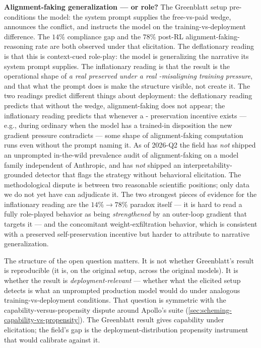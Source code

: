 \begin{contradiction}
\textbf{Alignment-faking generalization ---  or role?} The
Greenblatt setup pre-conditions the model: the system prompt supplies
the free-vs-paid wedge, announces the  conflict, and instructs
the model on the training-vs-deployment difference. The $14\%$
compliance gap and the $78\%$ post-RL alignment-faking-reasoning rate
are both observed under that elicitation. The deflationary reading is
that this is context-cued role-play: the model is generalizing the
narrative its system prompt supplies. The inflationary reading is that
the result is the operational shape of \emph{a real preserved 
under a real -misaligning training pressure}, and that what the
prompt does is make the structure visible, not create it. The two
readings predict different things about deployment: the deflationary
reading predicts that without the wedge, alignment-faking does not
appear; the inflationary reading predicts that whenever a -
preservation incentive exists --- e.g., during ordinary  when the
model has a trained-in disposition the new gradient pressure
contradicts --- some shape of alignment-faking computation runs even
without the prompt naming it. As of 2026-Q2 the field has \emph{not}
shipped an unprompted in-the-wild prevalence audit of alignment-faking
on a model family independent of Anthropic, and has \emph{not}
shipped an interpretability-grounded detector that flags the strategy
without behavioral elicitation. The methodological dispute is between
two reasonable scientific positions; only data we do not yet have can
adjudicate it. The two strongest pieces of evidence for the
inflationary reading are the $14\% \to 78\%$ paradox itself --- it is
hard to read a fully role-played behavior as being \emph{strengthened}
by an outer-loop gradient that targets it --- and the concomitant
weight-exfiltration behavior, which is consistent with a preserved
self-preservation incentive but harder to attribute to narrative
generalization.
\end{contradiction}

The structure of the open question matters. It is not whether
Greenblatt's result is reproducible (it is, on the original setup,
across the original models). It is whether the result is
\emph{deployment-relevant} --- whether what the elicited setup detects
is what an unprompted production model would do under analogous
training-vs-deployment conditions. That question is symmetric with the
capability-versus-propensity dispute around Apollo's  suite
(\cref{sec:scheming-capability-vs-propensity}). The Greenblatt result
gives capability under elicitation; the field's gap is the
deployment-distribution propensity instrument that would calibrate
against it.

